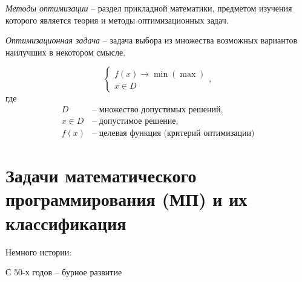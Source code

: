 
\begin{definition}
    \emph{Методы оптимизации} -- раздел прикладной математики, предметом изучения которого является теория и методы оптимизационных задач.
\end{definition}

\begin{definition}
    \emph{Оптимизационная задача} -- задача выбора из множества возможных вариантов наилучших в некотором смысле.
\end{definition}

\begin{note}
    \[
        \left\{\begin{array}{l}
            f(x) \rightarrow \min(\max) \\
            x \in D
        \end{array}\right.,
    \]
    где
    \[
        \begin{array}{rl}
            D       & \text{-- множество допустимых решений, }         \\
            x \in D & \text{-- допустимое решение, }                   \\
            f(x)    & \text{-- целевая функция (критерий оптимизации)}
        \end{array}
    \]
\end{note}

\section*{Задачи математического программирования (МП) и их классификация}

\begin{note}
    Немного истории:
    \begin{center}
    \end{center}

    С 50-х годов -- бурное развитие
    \begin{center}
    \end{center}
\end{note}

